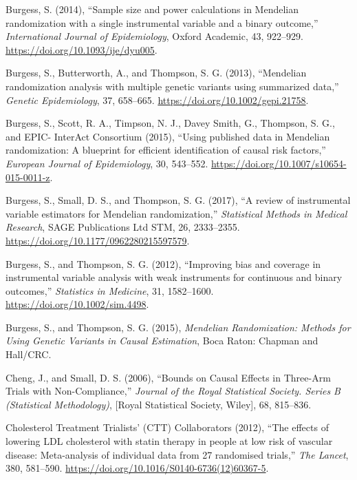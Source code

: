 \documentclass[
]{article}
\theoremstyle{plain}
\begin{document}
\leavevmode\hypertarget{ref-burgess_sample_2014}{}%
Burgess, S. (2014), ``Sample size and power calculations in Mendelian randomization with a single instrumental variable and a binary outcome,'' \emph{International Journal of Epidemiology}, Oxford Academic, 43, 922--929. \url{https://doi.org/10.1093/ije/dyu005}.

\leavevmode\hypertarget{ref-burgess_mendelian_2013}{}%
Burgess, S., Butterworth, A., and Thompson, S. G. (2013), ``Mendelian randomization analysis with multiple genetic variants using summarized data,'' \emph{Genetic Epidemiology}, 37, 658--665. \url{https://doi.org/10.1002/gepi.21758}.

\leavevmode\hypertarget{ref-burgess_using_2015}{}%
Burgess, S., Scott, R. A., Timpson, N. J., Davey Smith, G., Thompson, S. G., and EPIC- InterAct Consortium (2015), ``Using published data in Mendelian randomization: A blueprint for efficient identification of causal risk factors,'' \emph{European Journal of Epidemiology}, 30, 543--552. \url{https://doi.org/10.1007/s10654-015-0011-z}.

\leavevmode\hypertarget{ref-burgess_review_2017}{}%
Burgess, S., Small, D. S., and Thompson, S. G. (2017), ``A review of instrumental variable estimators for Mendelian randomization,'' \emph{Statistical Methods in Medical Research}, SAGE Publications Ltd STM, 26, 2333--2355. \url{https://doi.org/10.1177/0962280215597579}.

\leavevmode\hypertarget{ref-burgess_improving_2012}{}%
Burgess, S., and Thompson, S. G. (2012), ``Improving bias and coverage in instrumental variable analysis with weak instruments for continuous and binary outcomes,'' \emph{Statistics in Medicine}, 31, 1582--1600. \url{https://doi.org/10.1002/sim.4498}.

\leavevmode\hypertarget{ref-burgess_mendelian_2015}{}%
Burgess, S., and Thompson, S. G. (2015), \emph{Mendelian Randomization: Methods for Using Genetic Variants in Causal Estimation}, Boca Raton: Chapman and Hall/CRC.

\leavevmode\hypertarget{ref-cheng_bounds_2006}{}%
Cheng, J., and Small, D. S. (2006), ``Bounds on Causal Effects in Three-Arm Trials with Non-Compliance,'' \emph{Journal of the Royal Statistical Society. Series B (Statistical Methodology)}, {[}Royal Statistical Society, Wiley{]}, 68, 815--836.

\leavevmode\hypertarget{ref-cholesterol_treatment_trialists_ctt_collaborators_effects_2012}{}%
Cholesterol Treatment Trialists' (CTT) Collaborators (2012), ``The effects of lowering LDL cholesterol with statin therapy in people at low risk of vascular disease: Meta-analysis of individual data from 27 randomised trials,'' \emph{The Lancet}, 380, 581--590. \url{https://doi.org/10.1016/S0140-6736(12)60367-5}.
\end{document}
